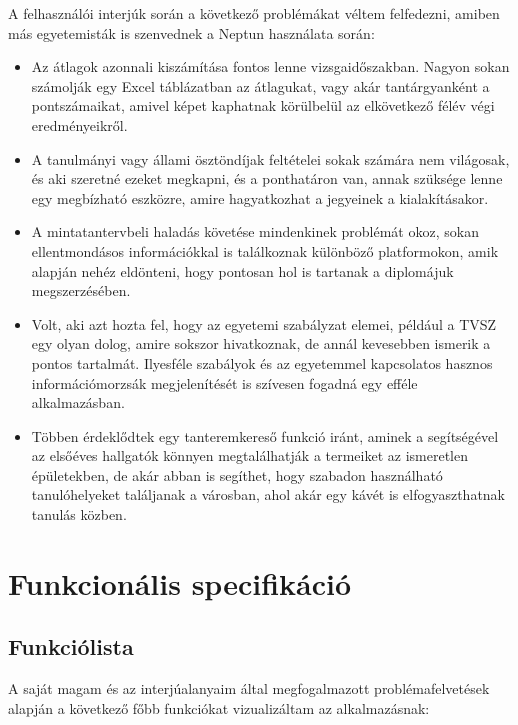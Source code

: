 \documentclass[a4paper,12pt]{report}
\begin{document}
A felhasználói interjúk során a következő problémákat véltem felfedezni, amiben más egyetemisták is szenvednek a Neptun használata során:

\begin{itemize}
    \item Az átlagok azonnali kiszámítása fontos lenne vizsgaidőszakban. Nagyon sokan számolják egy Excel táblázatban az átlagukat, vagy akár tantárgyanként a pontszámaikat, amivel képet kaphatnak körülbelül az elkövetkező félév végi eredményeikről.
    \item A tanulmányi vagy állami ösztöndíjak feltételei sokak számára nem világosak, és aki szeretné ezeket megkapni, és a ponthatáron van, annak szüksége lenne egy megbízható eszközre, amire hagyatkozhat a jegyeinek a kialakításakor.
    \item A mintatantervbeli haladás követése mindenkinek problémát okoz, sokan ellentmondásos információkkal is találkoznak különböző platformokon, amik alapján nehéz eldönteni, hogy pontosan hol is tartanak a diplomájuk megszerzésében.
    \item Volt, aki azt hozta fel, hogy az egyetemi szabályzat elemei, például a TVSZ egy olyan dolog, amire sokszor hivatkoznak, de annál kevesebben ismerik a pontos tartalmát. Ilyesféle szabályok és az egyetemmel kapcsolatos hasznos információmorzsák megjelenítését is szívesen fogadná egy efféle alkalmazásban.
    \item Többen érdeklődtek egy tanteremkereső funkció iránt, aminek a segítségével az elsőéves hallgatók könnyen megtalálhatják a termeiket az ismeretlen épületekben, de akár abban is segíthet, hogy szabadon használható tanulóhelyeket találjanak a városban, ahol akár egy kávét is elfogyaszthatnak tanulás közben.
\end{itemize}

\section{Funkcionális specifikáció}

\subsection{Funkciólista}

A saját magam és az interjúalanyaim által megfogalmazott problémafelvetések alapján a következő főbb funkciókat vizualizáltam az alkalmazásnak:
\end{document}
